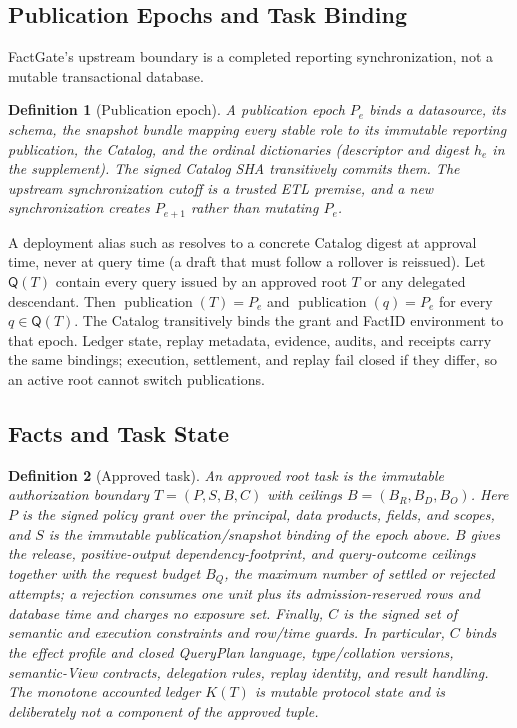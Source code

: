 \documentclass[10pt,journal,compsoc]{IEEEtran}
\newcommand{\system}{FactGate\xspace}
\newcommand{\code}[1]{\texttt{\detokenize{#1}}}
\newtheorem{definition}{Definition}
\begin{document}
\subsection{Publication Epochs and Task Binding}

\system's upstream boundary is a completed reporting synchronization, not a
mutable transactional database.

\begin{definition}[Publication epoch]
A publication epoch $P_e$ binds a datasource, its schema, the snapshot
bundle mapping every stable role to its immutable reporting publication,
the Catalog, and the ordinal dictionaries (descriptor and digest $h_e$ in
the supplement). The signed Catalog SHA transitively commits them. The
upstream synchronization cutoff is a trusted ETL premise, and a new
synchronization creates $P_{e+1}$ rather than mutating $P_e$.
\end{definition}

A deployment alias such as \code{latest publication} resolves to a concrete
Catalog digest at approval time, never at query time (a draft that must
follow a rollover is reissued). Let $\mathsf Q(T)$ contain every query issued by an approved root
$T$ or any delegated descendant. Then $\operatorname{publication}(T)=P_e$
and $\operatorname{publication}(q)=P_e$ for every $q\in\mathsf Q(T)$.
The Catalog transitively binds the grant and FactID environment to that
epoch. Ledger state, replay metadata, evidence, audits, and receipts carry
the same bindings; execution, settlement, and replay fail closed if
they differ, so an active root cannot switch publications.

\subsection{Facts and Task State}

\begin{definition}[Approved task]
\label{def:task}
An approved root task is the immutable authorization boundary
$T=(P,S,B,C)$ with ceilings $B=(B_R,B_D,B_O)$.
Here $P$ is the signed policy grant over the principal, data products,
fields, and scopes, and $S$ is the immutable publication/snapshot binding of
the epoch above. $B$ gives the release, positive-output
dependency-footprint, and query-outcome ceilings together with the request
budget $B_Q$, the maximum number of settled or rejected attempts; a
rejection consumes one unit plus its admission-reserved rows and database
time and charges no exposure set. Finally, $C$ is the signed set of
semantic and execution constraints and row/time guards.  In particular, $C$ binds the effect
profile and closed QueryPlan language, type/collation versions, semantic-View
contracts, delegation rules, replay identity, and result handling.  The
monotone accounted ledger $K(T)$ is mutable protocol state and is deliberately
\emph{not} a component of the approved tuple.
\end{definition}
\end{document}
